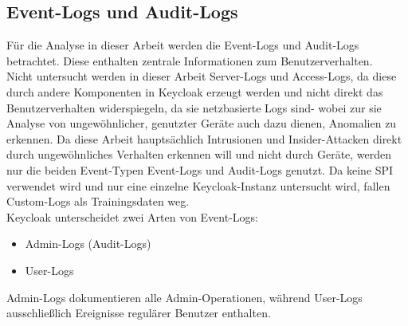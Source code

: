 \documentclass[a4paper,12pt]{article}
\begin{document}
	\subsection{Event-Logs und Audit-Logs}
	Für die Analyse in dieser Arbeit werden die Event-Logs und Audit-Logs betrachtet. Diese enthalten zentrale Informationen zum Benutzerverhalten.
	\\[0.5em]
	Nicht untersucht werden in dieser Arbeit Server-Logs und Access-Logs, da diese durch andere Komponenten in Keycloak erzeugt werden und nicht direkt das Benutzerverhalten widerspiegeln, da sie netzbasierte Logs sind- wobei zur sie Analyse von ungewöhnlicher, genutzter Geräte auch dazu dienen, Anomalien zu erkennen. Da diese Arbeit hauptsächlich Intrusionen und Insider-Attacken direkt durch ungewöhnliches Verhalten erkennen will und nicht durch Geräte, werden nur die beiden Event-Typen Event-Logs und Audit-Logs genutzt.
	Da keine SPI verwendet wird und nur eine einzelne Keycloak-Instanz untersucht wird, fallen Custom-Logs als Trainingsdaten weg.
	\\[0.5em]
	Keycloak unterscheidet zwei Arten von Event-Logs:
	\begin{itemize}
		\item Admin-Logs (Audit-Logs)
		\item User-Logs
	\end{itemize}
	Admin-Logs dokumentieren alle Admin-Operationen, während User-Logs ausschließlich Ereignisse regulärer Benutzer enthalten.
	
\end{document}
